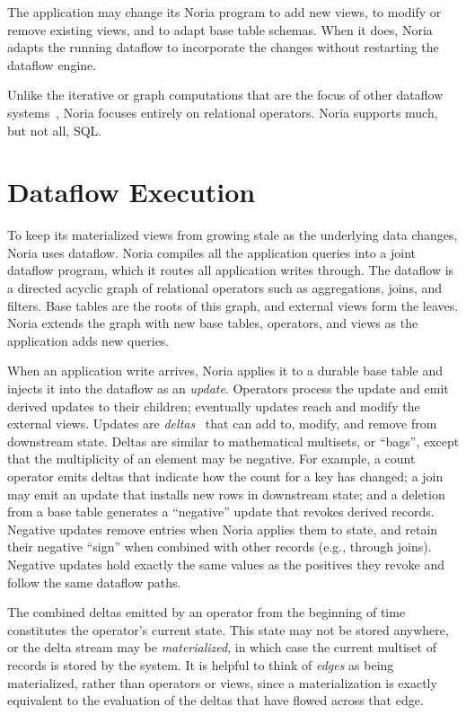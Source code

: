 The application may change its Noria program to add new views, to modify or
remove existing views, and to adapt base table schemas. When it does, Noria
adapts the running dataflow to incorporate the changes without restarting the
dataflow engine.

Unlike the iterative or graph computations that are the focus of other dataflow
systems~\cite{naiad, differential-dataflow}, Noria focuses entirely on
relational operators. Noria supports much, but not all, SQL.

\section{Dataflow Execution}

To keep its materialized views from growing stale as the underlying data
changes, Noria uses dataflow. Noria compiles all the application queries into a
joint dataflow program, which it routes all application writes through. The
dataflow is a directed acyclic graph of relational operators such as
aggregations, joins, and filters. Base tables are the roots of this graph, and
external views form the leaves. Noria extends the graph with new base tables,
operators, and views as the application adds new queries.

When an application write arrives, Noria applies it to a durable base table and
injects it into the dataflow as an \emph{update}. Operators process the update
and emit derived updates to their children; eventually updates reach and modify
the external views. Updates are \emph{deltas}~\cite{roll, differential-dataflow}
that can add to, modify, and remove from downstream state. Deltas are similar to
mathematical multisets, or ``bags'', except that the multiplicity of an element
may be negative. For example, a count operator emits deltas that indicate how
the count for a key has changed; a join may emit an update that installs new
rows in downstream state; and a deletion from a base table generates a
``negative'' update that revokes derived records. Negative updates remove
entries when Noria applies them to state, and retain their negative ``sign''
when combined with other records (e.g., through joins). Negative updates hold
exactly the same values as the positives they revoke and follow the same
dataflow paths.

The combined deltas emitted by an operator from the beginning of time
constitutes the operator's current state. This state may not be stored anywhere,
or the delta stream may be \textit{materialized}, in which case the current
multiset of records is stored by the system. It is helpful to think of
\emph{edges} as being materialized, rather than operators or views, since a
materialization is exactly equivalent to the evaluation of the deltas that have
flowed across that edge.

